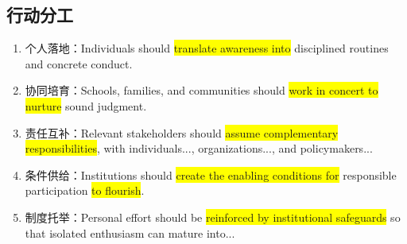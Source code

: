 ﻿\documentclass[lang=cn,11pt]{elegantbook}
\begin{document}
\subsection{行动分工}

\begin{enumerate}
    \item 个人落地：Individuals should \colorbox{yellow}{translate awareness into} disciplined routines and concrete conduct.
    \item 协同培育：Schools, families, and communities should \colorbox{yellow}{work in concert to nurture} sound judgment.
    \item 责任互补：Relevant stakeholders should \colorbox{yellow}{assume complementary responsibilities}, with individuals..., organizations..., and policymakers...
    \item 条件供给：Institutions should \colorbox{yellow}{create the enabling conditions for} responsible participation \colorbox{yellow}{to flourish}.
    \item 制度托举：Personal effort should be \colorbox{yellow}{reinforced by institutional safeguards} so that isolated enthusiasm can mature into...
\end{enumerate}
\end{document}
